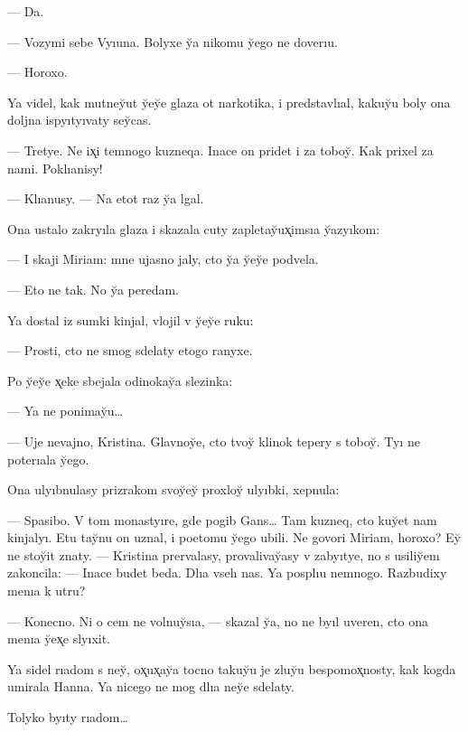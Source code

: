 \documentclass[10pt]{book}
\begin{document}
— Da.

— Vozymi sebe Vyıuna. Bolyxe y̆a nikomu y̆ego ne doverıu.

— Horoxo.

Ya videl, kak mutney̆ut y̆ey̆e glaza ot narkotika, i predstavlıal, kakuy̆u boly ona doljna ispyıtyıvaty sey̆cas.

— Tretye. Ne ix̨i temnogo kuzneqa. Inace on pridet i za toboy̆. Kak prixel za nami. Poklıanisy!

— Klıanusy. — Na etot raz y̆a lgal.

Ona ustalo zakryıla glaza i skazala cuty zapletay̆ux̨imsıa y̆azyıkom:

— I skaji Miriam: mne ujasno jaly, cto y̆a y̆ey̆e podvela.

— Eto ne tak. No y̆a peredam.

Ya dostal iz sumki kinjal, vlojil v y̆ey̆e ruku:

— Prosti, cto ne smog sdelaty etogo ranyxe.

Po y̆ey̆e x̨eke sbejala odinokay̆a slezinka:

— Ya ne ponimay̆u…

— Uje nevajno, Kristina. Glavnoy̆e, cto tvoy̆ klinok tepery s toboy̆. Tyı ne poterıala y̆ego.

Ona ulyıbnulasy prizrakom svoy̆ey̆ proxloy̆ ulyıbki, xepnula:

— Spasibo. V tom monastyıre, gde pogib Gans… Tam kuzneq, cto kuy̆et nam kinjalyı. Etu tay̆nu on uznal, i poetomu y̆ego ubili. Ne govori Miriam, horoxo? Ey̆ ne stoy̆it znaty. — Kristina prervalasy, provalivay̆asy v zabyıtye, no s usiliy̆em zakoncila: — Inace budet beda. Dlıa vseh nas. Ya posplıu nemnogo. Razbudixy menıa k utru?

— Konecno. Ni o cem ne volnuy̆sıa, — skazal y̆a, no ne byıl uveren, cto ona menıa y̆ex̨e slyıxit.

Ya sidel rıadom s ney̆, ox̨ux̨ay̆a tocno takuy̆u je zluy̆u bespomox̨nosty, kak kogda umirala Hanna. Ya nicego ne mog dlıa ney̆e sdelaty.

Tolyko byıty rıadom…
\end{document}
